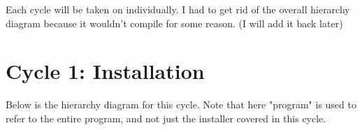 \documentclass[11pt]{article}
\begin{document}
                

            Each cycle will be taken on individually. I had to get rid of the overall hierarchy diagram because it wouldn't compile for some reason. (I will add it back later)
            
    \section{Cycle 1: Installation}
        Below is the hierarchy diagram for this cycle. Note that here "program" is used to refer to the entire program, and not just the installer covered in this cycle.
\end{document}
